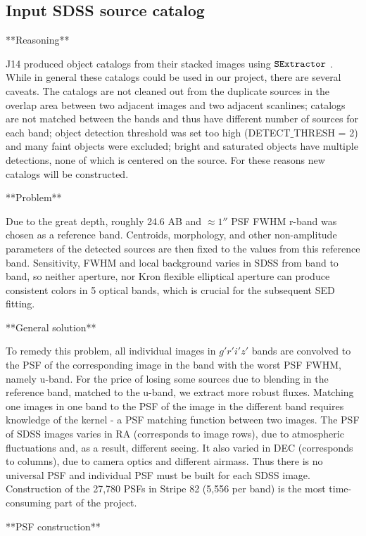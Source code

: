 \documentclass[numberedappendix,apj,twocolumn]{emulateapj}
\begin{document}
\subsection{Input SDSS source catalog} 
**Reasoning**

J14 produced object catalogs from their stacked images using $\tt SExtractor$ \citep[][]{Bertin1996}. While in general these catalogs could be used in our project, there are several caveats. The catalogs are not cleaned out from the duplicate sources in the overlap area between two adjacent images and two adjacent scanlines; catalogs are not matched between the bands and thus have different number of sources for each band; object detection threshold was set too high (DETECT$\_$THRESH = 2) and many faint objects were excluded; bright and saturated objects have multiple detections, none of which is centered on the source. For these reasons new catalogs will be constructed.

**Problem**

Due to the great depth, roughly 24.6 AB and $\approx1''$ PSF FWHM r-band was chosen as a reference band. Centroids, morphology, and other non-amplitude parameters of the detected sources are then fixed to the values from this reference band. Sensitivity, FWHM and local background varies in SDSS from band to band, so neither aperture, nor Kron flexible elliptical aperture \citep{Kron1980} can produce consistent colors in 5 optical bands, which is crucial for the subsequent SED fitting.

**General solution**

To remedy this problem, all individual images in $g'r'i'z'$ bands are convolved to the PSF of the corresponding image in the band with the worst PSF FWHM, namely u-band. For the price of losing some sources due to blending in the reference band, matched to the u-band, we extract more robust fluxes. Matching one images in one band to the PSF of the image in the different band requires knowledge of the kernel - a PSF matching function between two images. The PSF of SDSS images varies in RA (corresponds to image rows), due to atmospheric fluctuations and, as a result, different seeing. It also varied in DEC (corresponds to columns), due to camera optics and different airmass. Thus there is no universal PSF and individual PSF must be built for each SDSS image. Construction of the 27,780 PSFs in Stripe 82 (5,556 per band) is the most time-consuming part of the project.

**PSF construction**
\end{document}
